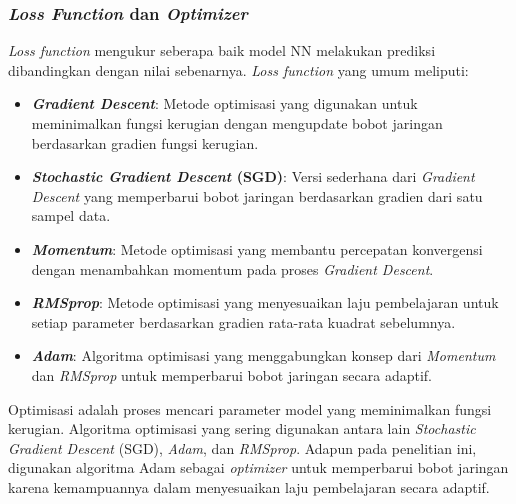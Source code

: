  \subsubsection{\emph{Loss Function} dan \emph{Optimizer}}
 \emph{Loss function} mengukur seberapa baik model NN melakukan prediksi dibandingkan dengan nilai sebenarnya. \emph{Loss function} yang umum meliputi:
 \begin{itemize}
   \item \textbf{\emph{Gradient Descent}}: Metode optimisasi yang digunakan untuk meminimalkan fungsi kerugian dengan mengupdate bobot jaringan berdasarkan gradien fungsi kerugian.
   \item \textbf{\emph{Stochastic Gradient Descent} (SGD)}: Versi sederhana dari \emph{Gradient Descent} yang memperbarui bobot jaringan berdasarkan gradien dari satu sampel data.
   \item \textbf{\emph{Momentum}}: Metode optimisasi yang membantu percepatan konvergensi dengan menambahkan momentum pada proses \emph{Gradient Descent}.
   \item \textbf{\emph{RMSprop}}: Metode optimisasi yang menyesuaikan laju pembelajaran untuk setiap parameter berdasarkan gradien rata-rata kuadrat sebelumnya.
   \item \textbf{\emph{Adam}}: Algoritma optimisasi yang menggabungkan konsep dari \emph{Momentum} dan \emph{RMSprop} untuk memperbarui bobot jaringan secara adaptif.
 \end{itemize}
 
 Optimisasi adalah proses mencari parameter model yang meminimalkan fungsi kerugian. Algoritma optimisasi yang sering digunakan antara lain \emph{Stochastic Gradient Descent} (SGD), \emph{Adam}, dan \emph{RMSprop}. Adapun pada penelitian ini, digunakan algoritma Adam sebagai \emph{optimizer} untuk memperbarui bobot jaringan karena kemampuannya dalam menyesuaikan laju pembelajaran secara adaptif.
 
